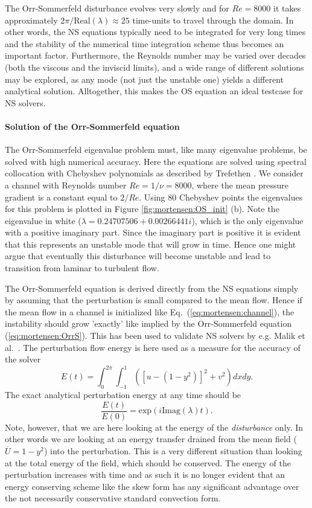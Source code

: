 The Orr-Sommerfeld disturbance evolves very slowly and for $Re=8000$ it takes approximately $2 \pi/\text{Real}(\lambda)\approx 25$ time-units to travel through the domain. In other words, the NS equations typically need to be integrated for very long times and the stability of the numerical time integration scheme thus becomes an important factor. Furthermore, the Reynolds number may be varied over decades (both the viscous and the inviscid limits), and a wide range of different solutions may be explored, as any mode (not just the unstable one) yields a different analytical solution. Alltogether, this makes the OS equation an ideal testcase for NS solvers.

\paragraph{Solution of the Orr-Sommerfeld equation}

The Orr-Sommerfeld eigenvalue problem must, like many eigenvalue problems, be solved with high numerical accuracy. Here the equations are solved using spectral collocation with Chebyshev polynomials as described by Trefethen \cite{Trefethen2006}. We consider a channel with Reynolds number $Re=1/\nu=8000$, where the mean pressure gradient is a constant equal to $2/Re$. Using 80 Chebyshev points the eigenvalues for this problem is plotted in Figure \ref{fig:mortensen:OS_init} (b). Note the eigenvalue in white ($\lambda = 0.24707506+0.00266441 i$), which is the only eigenvalue with a positive imaginary part. Since the imaginary part is positive it is evident that this represents an unstable mode that will grow in time. Hence one might argue that eventually this disturbance will become unstable and lead to transition from laminar to turbulent flow.

The Orr-Sommerfeld equation is derived directly from the NS equations simply by assuming that the perturbation is small compared to the mean flow. Hence if the mean flow in a channel is initialized like Eq.~(\eqref{eq:mortensen:channel}), the instability should grow 'exactly' like implied by the Orr-Sommerfeld equation (\eqref{eq:mortensen:OrrS}). This has been used to validate NS solvers by e.g. Malik et al.~\cite{MalikZangHussaini1984}. The perturbation flow energy is here used as a measure for the accuracy of the solver
\begin{equation}
  E(t)= \int_0^{2\pi}\int_{-1}^{1} \left( \left[u-(1-y^2)\right]^2 + v^2 \right) dx dy.
\end{equation}
The exact analytical perturbation energy at any time should be 
\[ \frac{E(t)}{E(0)}=\text{exp}(i \text{Imag}(\lambda) t).\]
Note, however, that we are here looking at the energy of the \textit{disturbance} only. In other words we are looking at an energy transfer drained from the mean field ($\overline{U}=1-y^2$) into the perturbation. This is a very different situation than looking at the total energy of the field, which should be conserved. The energy of the perturbation increases with time and as such it is no longer evident that an energy conserving scheme like the skew form has any significant advantage over the not necessarily conservative standard convection form.

